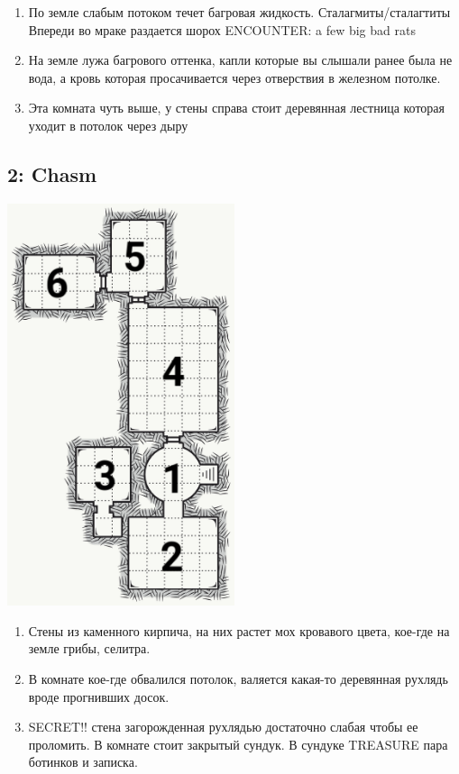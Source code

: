 \documentclass[a5paper,11pt]{book}
\begin{document}
\begin{multicols}{2}
\begin{enumerate}
\item По земле слабым потоком течет багровая жидкость. Сталагмиты/сталагтиты Впереди во мраке раздается шорох ENCOUNTER: a few big bad rats
\item На земле лужа багрового оттенка, капли которые вы слышали ранее была не вода, а кровь которая просачивается через отверствия в железном потолке.
\item Эта комната чуть выше, у стены справа стоит деревянная лестница которая уходит в потолок через дыру
\end{enumerate}

\subsection{2: Chasm}

\includegraphics[width=0.5\textwidth]{2}

\begin{enumerate}
\item Стены из каменного кирпича, на них растет мох кровавого цвета, кое-где на земле грибы, селитра.
\item В комнате кое-где обвалился потолок, валяется какая-то деревянная рухлядь вроде прогнивших досок.
\item SECRET!! стена загорожденная рухлядью достаточно слабая чтобы ее проломить. В комнате стоит закрытый сундук. В сундуке TREASURE пара ботинков и записка. 


\end{enumerate}
\end{multicols}
\end{document}
